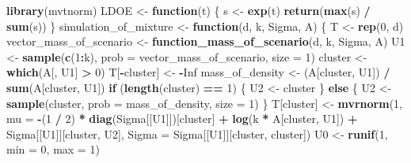 \documentclass[
]{article}
\newenvironment{Shaded}{\begin{snugshade}}{\end{snugshade}}
\newcommand{\AttributeTok}[1]{\textcolor[rgb]{0.13,0.29,0.53}{#1}}
\newcommand{\ConstantTok}[1]{\textcolor[rgb]{0.56,0.35,0.01}{#1}}
\newcommand{\ControlFlowTok}[1]{\textcolor[rgb]{0.13,0.29,0.53}{\textbf{#1}}}
\newcommand{\DecValTok}[1]{\textcolor[rgb]{0.00,0.00,0.81}{#1}}
\newcommand{\FunctionTok}[1]{\textcolor[rgb]{0.13,0.29,0.53}{\textbf{#1}}}
\newcommand{\NormalTok}[1]{#1}
\newcommand{\OtherTok}[1]{\textcolor[rgb]{0.56,0.35,0.01}{#1}}
\newcommand{\SpecialCharTok}[1]{\textcolor[rgb]{0.81,0.36,0.00}{\textbf{#1}}}
\begin{document}
\begin{Shaded}
\begin{Highlighting}[]
\FunctionTok{library}\NormalTok{(mvtnorm)}
\NormalTok{LDOE }\OtherTok{\textless{}{-}} \ControlFlowTok{function}\NormalTok{(t) \{}
\NormalTok{  s }\OtherTok{\textless{}{-}} \FunctionTok{exp}\NormalTok{(t)}
  \FunctionTok{return}\NormalTok{(}\FunctionTok{max}\NormalTok{(s) }\SpecialCharTok{/} \FunctionTok{sum}\NormalTok{(s))}
\NormalTok{\}}
\NormalTok{simulation\_of\_mixture }\OtherTok{\textless{}{-}} \ControlFlowTok{function}\NormalTok{(d, k, Sigma, A) \{}
\NormalTok{  T }\OtherTok{\textless{}{-}} \FunctionTok{rep}\NormalTok{(}\DecValTok{0}\NormalTok{, d)}
\NormalTok{  vector\_mass\_of\_scenario }\OtherTok{\textless{}{-}} \FunctionTok{function\_mass\_of\_scenario}\NormalTok{(d, k, Sigma, A)}
\NormalTok{  U1 }\OtherTok{\textless{}{-}} \FunctionTok{sample}\NormalTok{(}\FunctionTok{c}\NormalTok{(}\DecValTok{1}\SpecialCharTok{:}\NormalTok{k), }\AttributeTok{prob =}\NormalTok{ vector\_mass\_of\_scenario, }\AttributeTok{size =} \DecValTok{1}\NormalTok{)}
\NormalTok{  cluster }\OtherTok{\textless{}{-}} \FunctionTok{which}\NormalTok{(A[, U1] }\SpecialCharTok{\textgreater{}} \DecValTok{0}\NormalTok{)}
\NormalTok{  T[}\SpecialCharTok{{-}}\NormalTok{cluster] }\OtherTok{\textless{}{-}} \SpecialCharTok{{-}}\ConstantTok{Inf}
\NormalTok{  mass\_of\_density }\OtherTok{\textless{}{-}}\NormalTok{ (A[cluster, U1]) }\SpecialCharTok{/} \FunctionTok{sum}\NormalTok{(A[cluster, U1])}
  \ControlFlowTok{if}\NormalTok{ (}\FunctionTok{length}\NormalTok{(cluster) }\SpecialCharTok{==} \DecValTok{1}\NormalTok{) \{}
\NormalTok{    U2 }\OtherTok{\textless{}{-}}\NormalTok{ cluster}
\NormalTok{  \} }\ControlFlowTok{else}\NormalTok{ \{}
\NormalTok{    U2 }\OtherTok{\textless{}{-}} \FunctionTok{sample}\NormalTok{(cluster, }\AttributeTok{prob =}\NormalTok{ mass\_of\_density, }\AttributeTok{size =} \DecValTok{1}\NormalTok{)}
\NormalTok{  \}}
\NormalTok{  T[cluster] }\OtherTok{\textless{}{-}} \FunctionTok{mvrnorm}\NormalTok{(}\DecValTok{1}\NormalTok{, }\AttributeTok{mu =} \SpecialCharTok{{-}}\NormalTok{(}\DecValTok{1} \SpecialCharTok{/} \DecValTok{2}\NormalTok{) }\SpecialCharTok{*} \FunctionTok{diag}\NormalTok{(Sigma[[U1]])[cluster] }\SpecialCharTok{+} \FunctionTok{log}\NormalTok{(k }\SpecialCharTok{*}\NormalTok{ A[cluster, U1]) }\SpecialCharTok{+}\NormalTok{ Sigma[[U1]][cluster, U2], }\AttributeTok{Sigma =}\NormalTok{ Sigma[[U1]][cluster, cluster])}
\NormalTok{  U0 }\OtherTok{\textless{}{-}} \FunctionTok{runif}\NormalTok{(}\DecValTok{1}\NormalTok{, }\AttributeTok{min =} \DecValTok{0}\NormalTok{, }\AttributeTok{max =} \DecValTok{1}\NormalTok{)}

\end{Highlighting}
\end{Shaded}
\end{document}
